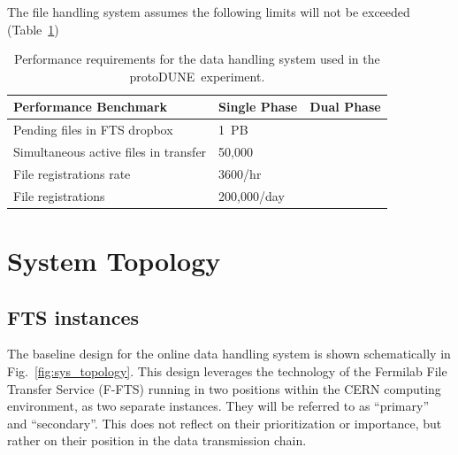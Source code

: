 \documentclass[pdftex,12pt,letter]{article}
\newcommand{\pd}{protoDUNE\ }
\begin{document}
 The file handling system assumes the following limits will not be exceeded (Table~\ref{fig:dh_perf})
\begin{table}[tbh]
\centering
\begin{tabular}{l l l}
\hline
\textbf{Performance Benchmark} & \textbf{Single Phase} & \textbf{Dual Phase}\\
\hline
\hline
Pending files in FTS dropbox             & 1~PB        & \\
Simultaneous active files in transfer    & 50,000      & \\
File registrations rate                  & 3600/hr     & \\
File registrations                       & 200,000/day & \\
\hline
\end{tabular}
\caption{\label{fig:dh_perf}Performance requirements for the data handling system used in the \pd experiment.}
\end{table}

\section{System Topology}
\subsection{FTS instances}
The baseline design for the online data handling system is shown schematically in Fig.~\ref{fig:sys_topology}.  This design leverages the technology of the Fermilab
File Transfer Service (F-FTS) running in two positions within the CERN computing environment, as two separate instances. They will be referred to as ``primary'' and
``secondary''. This does not reflect on their prioritization or importance, but rather on their position in the data transmission chain.
\end{document}
